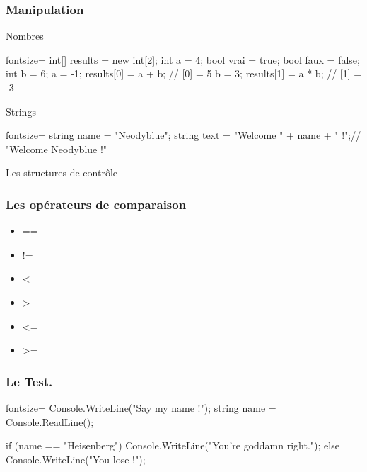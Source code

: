 \begin{frame}[fragile]
  \frametitle{Manipulation}

  \begin{center}{\large Nombres}\end{center}
  \begin{csharpcode*}{fontsize=\scriptsize}
    int[] results = new int[2];
    int a = 4;
    bool vrai = true;
    bool faux = false;
    int b = 6;
    a = -1;
    results[0] = a + b; // [0] = 5
    b = 3;
    results[1] = a * b; // [1] = -3
  \end{csharpcode*}

  \pause

  \begin{center}{\large Strings}\end{center}
  \begin{csharpcode*}{fontsize=\scriptsize}
    string name = "Neodyblue";
    string text = "Welcome " + name + " !";// "Welcome Neodyblue !"
  \end{csharpcode*}
\end{frame}

\begin{frame}
  \begin{center}
    \vspace{1cm}
    {\Large Les structures de contrôle}
  \end{center}
\end{frame}

\begin{frame}[fragile]
  \frametitle{Les opérateurs de comparaison}

  \begin{itemize}
    \item<+-> ==
    \item<+-> !=
    \item<+-> <
    \item<+-> >
    \item<+-> <=
    \item<+-> >=
  \end{itemize}
\end{frame}

\begin{frame}[fragile]
  \frametitle{Le Test.}

  \begin{csharpcode*}{fontsize=\normalsize}
    Console.WriteLine("Say my name !");
    string name = Console.ReadLine();

    if (name == "Heisenberg")
    {
      Console.WriteLine("You're goddamn right.");
    }
    else
    {
      Console.WriteLine("You lose !");
    }
  \end{csharpcode*}
\end{frame}

